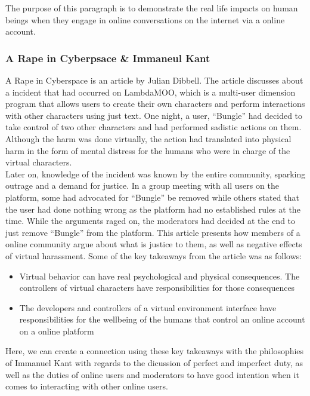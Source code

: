 \documentclass[a4paper]{article}
\begin{document}
\noindent The purpose of this paragraph is to demonstrate the real life impacts on human beings when they engage
in online conversations on the internet via a online account. 

\subsubsection{A Rape in Cyberpsace \& Immaneul Kant}
A Rape in Cyberspace is an article by Julian Dibbell. The article discusses about a incident that had occurred on 
LambdaMOO, which is a multi-user dimension program that allows users to create their own characters and perform 
interactions with other characters using just text. One night, a user, ``Bungle'' had decided to take control of two 
other  characters and had performed sadistic actions on them. Although the harm was done virtually, the action had 
translated into physical harm in the form of mental distress for the humans who were in charge of the virtual 
characters. \\

\noindent Later on, knowledge of the incident was known by the entire community, sparking outrage and a demand for 
justice. In a group meeting with all users on the platform, some had advocated for ``Bungle'' be removed while others 
stated that the user had done nothing wrong as the platform had no established rules at the time. While the arguments 
raged on, the moderators had decided at the end to just remove ``Bungle'' from the platform. This article presents how
members of a online community argue about what is justice to them, as well as negative effects of virtual harassment. 
Some of the key takeaways from the article was as follows:

\begin{itemize}
    \item Virtual behavior can have real psychological and physical consequences. The controllers of virtual characters
    have responsibilities for those consequences
    \item The developers and controllers of a virtual environment interface have responsibilities  for the wellbeing
    of the humans that control an online account on a online platform
\end{itemize}

\noindent Here, we can create a connection using these key takeaways with the philosophies of Immanuel Kant with 
regards to the dicussion of perfect and imperfect duty, as well as the duties of online users and moderators to have 
good intention when it comes to interacting with other online users.
\end{document}
